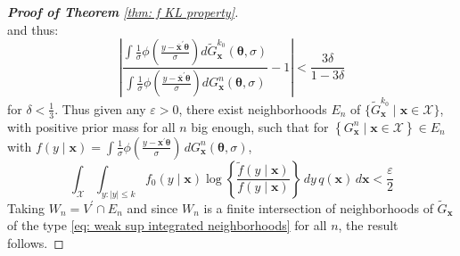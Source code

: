 \begin{proof}[\hypertarget{proof of thm KL property}{\textbf{Proof of Theorem}} \ref{thm: f KL property}]
$$$$
and thus:
$$
\left|\frac{\int \frac{1}{\sigma} \phi\left(\frac{y-\bar{\boldsymbol{x}}^{\prime} \boldsymbol{\theta}}{\sigma}\right) d \tilde{G}^{k_0}_{\boldsymbol{x}}(\boldsymbol{\theta}, \sigma)}{\int \frac{1}{\sigma} \phi\left(\frac{y-\bar{\boldsymbol{x}}^{\prime} \boldsymbol{\theta}}{\sigma}\right) d G^n_{\boldsymbol{x}}(\boldsymbol{\theta}, \sigma)}-1\right|<\frac{3 \delta}{1-3 \delta}
$$
for $\delta<\frac{1}{3}$. Thus given any $\varepsilon>0$, there exist neighborhoods $E_n$ of $\{\tilde{G}^{k_0}_{\boldsymbol{x}} \mid \boldsymbol{x} \in \mathcal{X}\}$, with positive prior mass for all $n$ big enough, such that for $\left\{G^n_{\boldsymbol{x}} \mid \boldsymbol{x} \in \mathcal{X}\right\} \in E_n$ with $f(y \mid \boldsymbol{x})=\int \frac{1}{\sigma} \phi (\frac{y-\boldsymbol{x}^{\prime} \boldsymbol{\theta}}{\sigma}) \, d G^n_{\boldsymbol{x}}(\boldsymbol{\theta}, \sigma)$,
$$
\int_{\mathcal{X}} \int_{y:|y| \leq k} f_0(y \mid \boldsymbol{x}) \log \left\{\frac{\tilde{f}(y \mid \boldsymbol{x})}{f(y \mid \boldsymbol{x})}\right\} \, d y \, q(\boldsymbol{x}) \, d \boldsymbol{x}<\frac{\varepsilon}{2}
$$
Taking $W_n=V^{\prime} \cap E_n$ and since $W_n$ is a finite intersection of neighborhoods of $\tilde{G}_{\boldsymbol{x}}$ of the type \eqref{eq: weak sup integrated neighborhoods} for all $n$, the result follows.
\end{proof}

